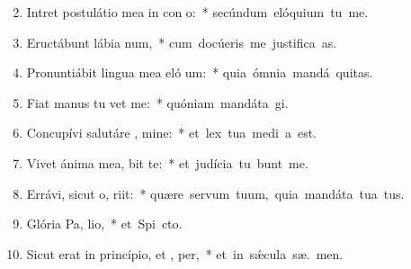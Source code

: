 \begin{flushleft}
\begin{enumerate}[leftmargin=*]
\setcounter{enumi}{1}

\item Intret postulátio mea in con o:~* \mbox{secúndum elóquium tu  me.}
\item Eructábunt lábia  num,~* \mbox{cum docúeris me justifica as.}
\item Pronuntiábit lingua mea eló um:~* \mbox{quia ómnia mandá  \textaccent{\'{\ae}}quitas.}
\item Fiat manus tu  vet me:~* \mbox{quóniam mandáta  gi.}
\item Concupívi salutáre , mine:~* \mbox{et lex tua medi a est.}
\item Vivet ánima mea,  bit te:~* \mbox{et judícia tu bunt me.}
\item Errávi, sicut o,  riit:~* \mbox{quære servum tuum, quia mandáta tua   tus.}
\item Glória Pa,  lio,~* \mbox{et Spi cto.}
\item Sicut erat in princípio, et ,  per,~* \mbox{et in s\'{\ae}cula sæ. men.}


\end{enumerate}
\end{flushleft}

